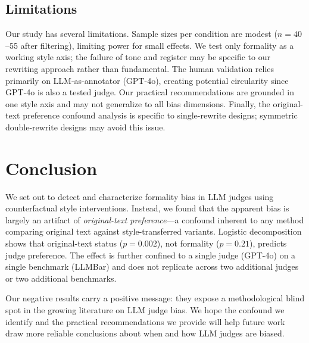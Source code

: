 \documentclass[11pt,a4paper]{article}
\begin{document}
\subsection{Limitations}

Our study has several limitations. Sample sizes per condition are modest ($n=40$--55 after filtering), limiting power for small effects. We test only formality as a working style axis; the failure of tone and register may be specific to our rewriting approach rather than fundamental. The human validation relies primarily on LLM-as-annotator (GPT-4o), creating potential circularity since GPT-4o is also a tested judge. Our practical recommendations are grounded in one style axis and may not generalize to all bias dimensions. Finally, the original-text preference confound analysis is specific to single-rewrite designs; symmetric double-rewrite designs may avoid this issue.

\section{Conclusion}

We set out to detect and characterize formality bias in LLM judges using counterfactual style interventions. Instead, we found that the apparent bias is largely an artifact of \emph{original-text preference}---a confound inherent to any method comparing original text against style-transferred variants. Logistic decomposition shows that original-text status ($p=0.002$), not formality ($p=0.21$), predicts judge preference. The effect is further confined to a single judge (GPT-4o) on a single benchmark (LLMBar) and does not replicate across two additional judges or two additional benchmarks.

Our negative results carry a positive message: they expose a methodological blind spot in the growing literature on LLM judge bias. We hope the confound we identify and the practical recommendations we provide will help future work draw more reliable conclusions about when and how LLM judges are biased.


\end{document}
